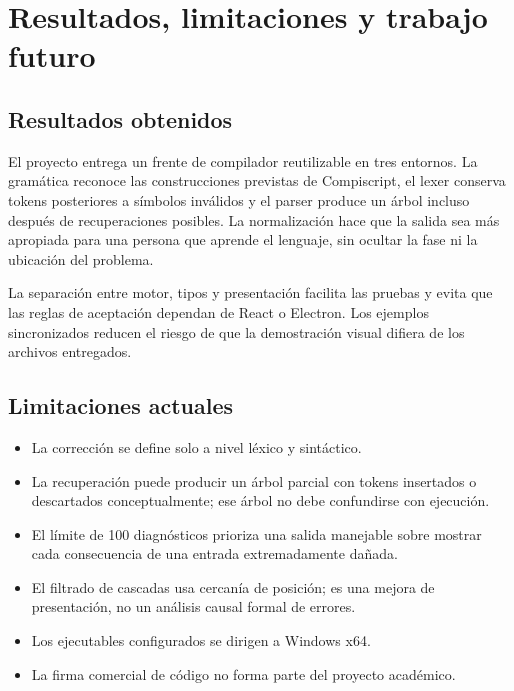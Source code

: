 \documentclass[12pt,letterpaper,oneside]{report}
\begin{document}
\chapter{Resultados, limitaciones y trabajo futuro}

\section{Resultados obtenidos}

El proyecto entrega un frente de compilador reutilizable en tres entornos. La
gramática reconoce las construcciones previstas de Compiscript, el lexer conserva
tokens posteriores a símbolos inválidos y el parser produce un árbol incluso después
de recuperaciones posibles. La normalización hace que la salida sea más apropiada
para una persona que aprende el lenguaje, sin ocultar la fase ni la ubicación del
problema.

La separación entre motor, tipos y presentación facilita las pruebas y evita que las
reglas de aceptación dependan de React o Electron. Los ejemplos sincronizados reducen
el riesgo de que la demostración visual difiera de los archivos entregados.

\section{Limitaciones actuales}

\begin{itemize}
  \item La corrección se define solo a nivel léxico y sintáctico.
  \item La recuperación puede producir un árbol parcial con tokens insertados o
        descartados conceptualmente; ese árbol no debe confundirse con ejecución.
  \item El límite de 100 diagnósticos prioriza una salida manejable sobre mostrar cada
        consecuencia de una entrada extremadamente dañada.
  \item El filtrado de cascadas usa cercanía de posición; es una mejora de
        presentación, no un análisis causal formal de errores.
  \item Los ejecutables configurados se dirigen a Windows x64.
  \item La firma comercial de código no forma parte del proyecto académico.
\end{itemize}
\end{document}
